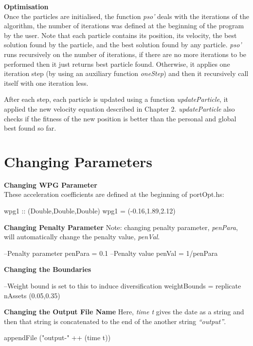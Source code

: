 \documentclass[]{report}
\begin{document}
  \textbf{Optimisation} \\
  Once the particles are initialised, the function \textit{pso'} deals with the iterations of the algorithm, the number of iterations was defined at the beginning of the program by the user. Note that each particle contains its position, its velocity, the best solution found by the particle, and the best solution found by any particle. \textit{pso'} runs recursively on the number of iterations, if there are no more iterations to be performed then it just returns best particle found. Otherwise, it applies one iteration step (by using an auxiliary function \textit{oneStep}) and then it recursively call itself with one iteration less.

  After each step, each particle is updated using a function \textit{updateParticle}, it applied the new velocity equation described in Chapter 2. \textit{updateParticle} also checks if the fitness of the new position is better than the personal and global best found so far. 


\section*{Changing Parameters}
  \textbf{Changing WPG Parameter}\\
  These acceleration coefficients are defined at the beginning of portOpt.hs:
  \begin{code}
    wpg1 :: (Double,Double,Double)
    wpg1 = (-0.16,1.89,2.12)
  \end{code}
  \textbf{Changing Penalty Parameter} Note: changing penalty parameter, \textit{penPara}, will automatically change the penalty value, \textit{penVal}.
  \begin{code}
    --Penalty parameter
    penPara = 0.1
    --Penalty value
    penVal = 1/penPara
  \end{code}
  \textbf{Changing the Boundaries}
  \begin{code}
    --Weight bound is set to this to induce diversification
    weightBounds = replicate nAssets (0.05,0.35)
  \end{code}
  \textbf{Changing the Output File Name} Here, \textit{time t} gives the date as a string and then that string is concatenated to the end of the another string \textit{``output''}.
  \begin{code}
    appendFile ("output-" ++ (time t))
  \end{code}
\end{document}
